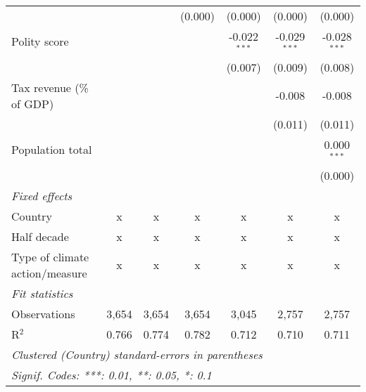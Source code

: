 \begin{tabular}{lcccccc}
                                                                               &              &               & (0.000)       & (0.000)        & (0.000)        & (0.000)\\   
   Polity score                                                                &              &               &               & -0.022$^{***}$ & -0.029$^{***}$ & -0.028$^{***}$\\   
                                                                               &              &               &               & (0.007)        & (0.009)        & (0.008)\\   
   Tax revenue (\% of GDP)                                                     &              &               &               &                & -0.008         & -0.008\\   
                                                                               &              &               &               &                & (0.011)        & (0.011)\\   
   Population total                                                            &              &               &               &                &                & 0.000$^{***}$\\   
                                                                               &              &               &               &                &                & (0.000)\\   
   \emph{Fixed effects}\\
   Country                                                                     & x            & x             & x             & x              & x              & x\\  
   Half decade                                                                 & x            & x             & x             & x              & x              & x\\  
   Type of climate action/measure                                              & x            & x             & x             & x              & x              & x\\  
   \midrule \emph{Fit statistics}\\
   Observations                                                                & 3,654        & 3,654         & 3,654         & 3,045          & 2,757          & 2,757\\  
   R$^2$                                                                       & 0.766        & 0.774         & 0.782         & 0.712          & 0.710          & 0.711\\  
   \midrule
   \multicolumn{7}{l}{\emph{Clustered (Country) standard-errors in parentheses}}\\
   \multicolumn{7}{l}{\emph{Signif. Codes: ***: 0.01, **: 0.05, *: 0.1}}\\
\end{tabular}
\par\endgroup


